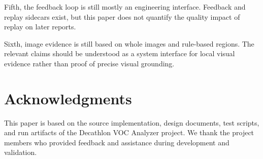 \documentclass[11pt]{article}
\begin{document}
Fifth, the feedback loop is still mostly an engineering interface. Feedback and replay sidecars exist, but this paper does not quantify the quality impact of replay on later reports.

Sixth, image evidence is still based on whole images and rule-based regions. The relevant claims should be understood as a system interface for local visual evidence rather than proof of precise visual grounding.

\section{Acknowledgments}
This paper is based on the source implementation, design documents, test scripts, and run artifacts of the Decathlon VOC Analyzer project. We thank the project members who provided feedback and assistance during development and validation.



\end{document}
